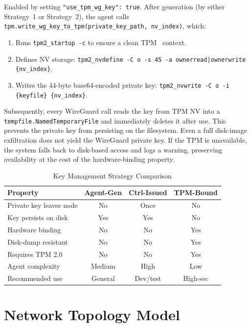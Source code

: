 \documentclass[conference]{IEEEtran}
\begin{document}
Enabled by setting \texttt{"use\_tpm\_wg\_key": true}. After generation (by
either Strategy~1 or Strategy~2), the agent calls
\texttt{tpm.write\_wg\_key\_to\_tpm(private\_key\_path, nv\_index)}, which:
\begin{enumerate}
  \item Runs \texttt{tpm2\_startup -c} to ensure a clean TPM~\cite{tpm2} context.
  \item Defines NV storage: \texttt{tpm2\_nvdefine -C o -s 45 -a
        ownerread|ownerwrite \{nv\_index\}}.
  \item Writes the 44-byte base64-encoded private key: \texttt{tpm2\_nvwrite -C o
        -i \{keyfile\} \{nv\_index\}}.
\end{enumerate}

Subsequently, every WireGuard call reads the key from TPM NV into a
\texttt{tempfile.NamedTemporaryFile} and immediately deletes it after use. This
prevents the private key from persisting on the filesystem. Even a full disk-image
exfiltration does not yield the WireGuard private key. If the TPM is unavailable,
the system falls back to disk-based access and logs a warning, preserving
availability at the cost of the hardware-binding property.

\begin{table}[!t]
\caption{Key Management Strategy Comparison}
\label{tab:keymanagement}
\centering
\begin{tabular}{lccc}
\toprule
\textbf{Property} & \textbf{Agent-Gen} & \textbf{Ctrl-Issued} & \textbf{TPM-Bound} \\
\midrule
Private key leaves node & No & Once & No \\
Key persists on disk    & Yes & Yes & No \\
Hardware binding        & No & No & Yes \\
Disk-dump resistant     & No & No & Yes \\
Requires TPM 2.0        & No & No & Yes \\
Agent complexity        & Medium & High & Low \\
Recommended use         & General & Dev/test & High-sec \\
\bottomrule
\end{tabular}
\end{table}


\FloatBarrier
\section{Network Topology Model}
\label{sec:topology}
\end{document}
